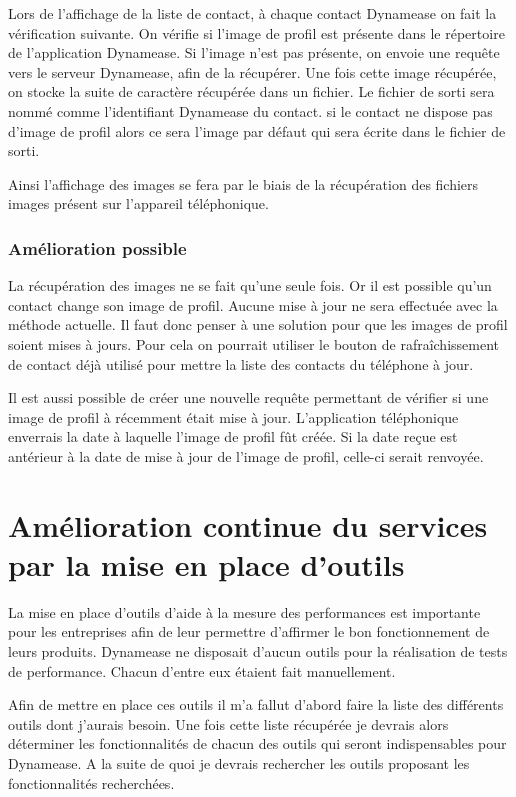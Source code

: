 Lors de l'affichage de la liste de contact, à chaque contact Dynamease on fait la vérification suivante. On vérifie si l'image de profil est présente dans le répertoire de l'application Dynamease. Si l'image n'est pas présente, on envoie une requête vers le serveur Dynamease, afin de la récupérer. Une fois cette image récupérée, on stocke la suite de caractère récupérée dans un fichier. Le fichier de sorti sera nommé comme l'identifiant Dynamease du contact. si le contact ne dispose pas d'image de profil alors ce sera l'image par défaut qui sera écrite dans le fichier de sorti.

Ainsi l'affichage des images se fera par le biais de la récupération des fichiers images présent sur l'appareil téléphonique.

\subsubsection{Amélioration possible}

La récupération des images ne se fait qu'une seule fois. Or il est possible qu'un contact change son image de profil. Aucune mise à jour ne sera effectuée avec la méthode actuelle. Il faut donc penser à une solution pour que les images de profil soient mises à jours. Pour cela on pourrait utiliser le bouton de rafraîchissement de contact déjà utilisé pour mettre la liste des contacts du téléphone à jour.

Il est aussi possible de créer une nouvelle requête permettant de vérifier si une image de profil à récemment était mise à jour. L'application téléphonique enverrais la date à laquelle l'image de profil fût créée. Si la date reçue est antérieur à la date de mise à jour de l'image de profil, celle-ci serait renvoyée. 


\section{Amélioration continue du services par la mise en place d'outils}

La mise en place d'outils d'aide à la mesure des performances est importante pour les entreprises afin de leur permettre d'affirmer le bon fonctionnement de leurs produits. Dynamease ne disposait d'aucun outils pour la réalisation de tests de performance. Chacun d'entre eux étaient fait manuellement.

Afin de mettre en place ces outils il m'a fallut d'abord faire la liste des différents outils dont j'aurais besoin. Une fois cette liste récupérée je devrais alors déterminer les fonctionnalités de chacun des outils qui seront indispensables pour Dynamease. A la suite de quoi je devrais rechercher les outils proposant les fonctionnalités recherchées.

